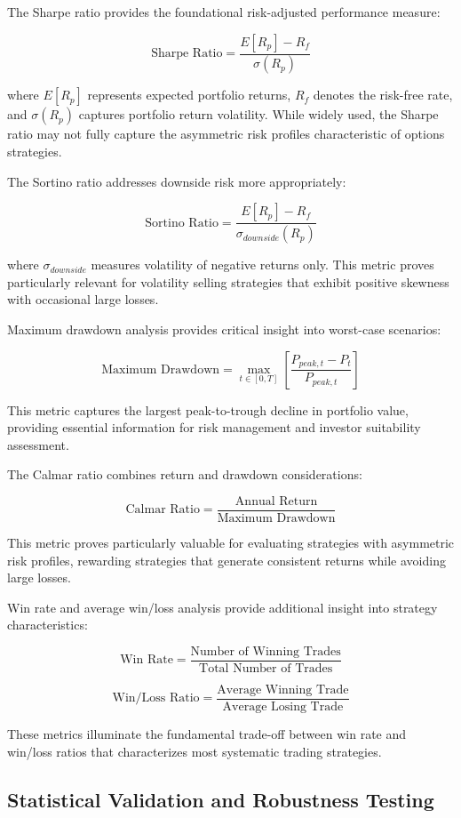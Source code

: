 \documentclass[
  american,
  11pt,
  11pt,
  letterpaper,
  onecolumn]{article}
\begin{document}
The Sharpe ratio provides the foundational risk-adjusted performance
measure:

\[\text{Sharpe Ratio} = \frac{E[R_p] - R_f}{\sigma(R_p)}\]

where \(E[R_p]\) represents expected portfolio returns, \(R_f\) denotes
the risk-free rate, and \(\sigma(R_p)\) captures portfolio return
volatility. While widely used, the Sharpe ratio may not fully capture
the asymmetric risk profiles characteristic of options strategies.

The Sortino ratio addresses downside risk more appropriately:

\[\text{Sortino Ratio} = \frac{E[R_p] - R_f}{\sigma_{downside}(R_p)}\]

where \(\sigma_{downside}\) measures volatility of negative returns
only. This metric proves particularly relevant for volatility selling
strategies that exhibit positive skewness with occasional large losses.

Maximum drawdown analysis provides critical insight into worst-case
scenarios:

\[\text{Maximum Drawdown} = \max_{t \in [0,T]} \left[\frac{P_{peak,t} - P_t}{P_{peak,t}}\right]\]

This metric captures the largest peak-to-trough decline in portfolio
value, providing essential information for risk management and investor
suitability assessment.

The Calmar ratio combines return and drawdown considerations:

\[\text{Calmar Ratio} = \frac{\text{Annual Return}}{\text{Maximum Drawdown}}\]

This metric proves particularly valuable for evaluating strategies with
asymmetric risk profiles, rewarding strategies that generate consistent
returns while avoiding large losses.

Win rate and average win/loss analysis provide additional insight into
strategy characteristics:

\[\text{Win Rate} = \frac{\text{Number of Winning Trades}}{\text{Total Number of Trades}}\]

\[\text{Win/Loss Ratio} = \frac{\text{Average Winning Trade}}{\text{Average Losing Trade}}\]

These metrics illuminate the fundamental trade-off between win rate and
win/loss ratios that characterizes most systematic trading strategies.

\subsection{Statistical Validation and Robustness
Testing}\label{statistical-validation-and-robustness-testing}
\end{document}
